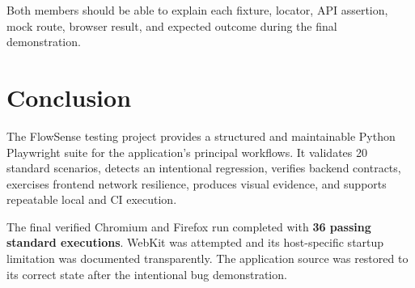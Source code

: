\documentclass[11pt,a4paper]{article}
\begin{document}
Both members should be able to explain each fixture, locator, API assertion, mock route, browser result, and expected outcome during the final demonstration.

\section{Conclusion}

The FlowSense testing project provides a structured and maintainable Python Playwright suite for the application's principal workflows. It validates 20 standard scenarios, detects an intentional regression, verifies backend contracts, exercises frontend network resilience, produces visual evidence, and supports repeatable local and CI execution.

The final verified Chromium and Firefox run completed with \textbf{36 passing standard executions}. WebKit was attempted and its host-specific startup limitation was documented transparently. The application source was restored to its correct state after the intentional bug demonstration.
\end{document}
